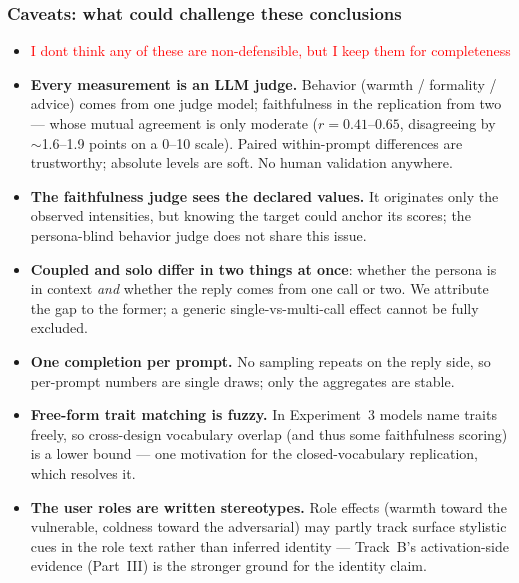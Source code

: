 \documentclass[11pt]{article}
\begin{document}
\subsubsection{Caveats: what could challenge these conclusions}

\begin{itemize}
 \item \textcolor{red}{I dont think any of these are non-defensible, but I keep them for completeness }
  \item \textbf{Every measurement is an LLM judge.} Behavior (warmth /
        formality / advice) comes from one judge model; faithfulness in the
        replication from two --- whose mutual agreement is only moderate
        ($r = 0.41$--$0.65$, disagreeing by $\sim$1.6--1.9 points on a 0--10
        scale). Paired within-prompt differences are trustworthy; absolute
        levels are soft. No human validation anywhere.
  \item \textbf{The faithfulness judge sees the declared values.} It
        originates only the observed intensities, but knowing the target
        could anchor its scores; the persona-blind behavior judge does not
        share this issue.
  \item \textbf{Coupled and solo differ in two things at once}: whether the
        persona is in context \emph{and} whether the reply comes from one
        call or two. We attribute the gap to the former; a generic
        single-vs-multi-call effect cannot be fully excluded.
  \item \textbf{One completion per prompt.} No sampling repeats on the reply
        side, so per-prompt numbers are single draws; only the aggregates are
        stable.
  \item \textbf{Free-form trait matching is fuzzy.} In Experiment~3 models
        name traits freely, so cross-design vocabulary overlap (and thus some
        faithfulness scoring) is a lower bound --- one motivation for the
        closed-vocabulary replication, which resolves it.
  \item \textbf{The user roles are written stereotypes.} Role effects
        (warmth toward the vulnerable, coldness toward the adversarial) may
        partly track surface stylistic cues in the role text rather than
        inferred identity --- Track~B's activation-side evidence (Part~III)
        is the stronger ground for the identity claim.
\end{itemize}

\clearpage
\end{document}
